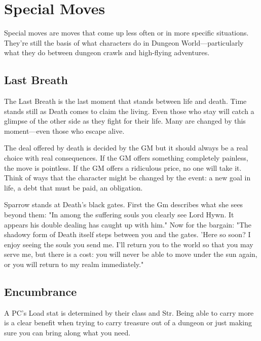 \chapter{Special Moves}
   
       

Special moves are moves that come up less often or in more specific situations. They're still the basis of what characters do in Dungeon World—particularly what they do between dungeon crawls and high-flying adventures.

       
\section{Last Breath}   
       

The Last Breath is the last moment that stands between life and death. Time stands still as Death comes to claim the living. Even those who stay will catch a glimpse of the other side as they fight for their life. Many are changed by this moment—even those who escape alive.

       

The deal offered by death is decided by the GM but it should always be a real choice with real consequences. If the GM offers something completely painless, the move is pointless. If the GM offers a ridiculous price, no one will take it. Think of ways that the character might be changed by the event: a new goal in life, a debt that must be paid, an obligation.

       
\startExample
Sparrow stands at Death's black gates. First the Gm describes what she sees beyond them: "In among the suffering souls you clearly see Lord Hywn. It appears his double dealing has caught up with him." Now for the bargain: "The shadowy form of Death itself steps between you and the gates. 'Here so soon? I enjoy seeing the souls you send me. I'll return you to the world so that you may serve me, but there is a cost: you will never be able to move under the sun again, or you will return to my realm immediately."
\stopExample
       
\section{Encumbrance}   
       

A PC's Load stat is determined by their class and Str. Being able to carry more is a clear benefit when trying to carry treasure out of a dungeon or just making sure you can bring along what you need.

